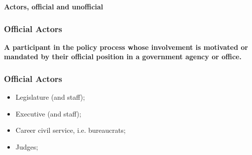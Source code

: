 \documentclass[aspectratio=169]{beamer}
\theoremstyle{principle}
\begin{document}
%

\begin{frame}
\begin{center}
\Huge\textbf{Actors, official and unofficial}
\end{center}
\end{frame}

\begin{frame}
\frametitle{Official Actors}
\begin{center}
\Large \textbf{A participant in the policy process whose involvement is motivated or mandated by their official position in a government agency or office.}
\end{center}
\end{frame}

\begin{frame}
\frametitle{Official Actors}
\begin{itemize}
\item Legislature (and staff);
\bigskip
\bigskip
\item Executive (and staff);
\bigskip
\bigskip
\item Career civil service, i.e. bureaucrats;
\bigskip
\bigskip
\item Judges;
\end{itemize}
\end{frame}
\end{document}
